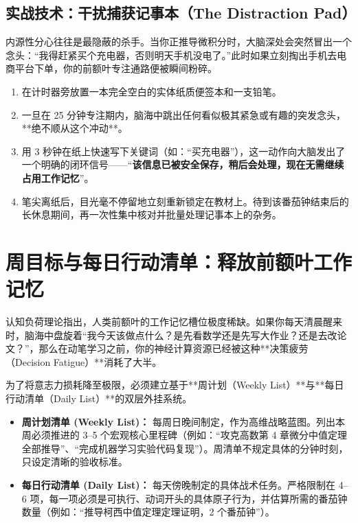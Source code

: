 \documentclass[12pt,a4paper,openany]{ctexbook}
\begin{document}
\subsection*{实战技术：干扰捕获记事本（The Distraction Pad）}

内源性分心往往是最隐蔽的杀手。当你正推导微积分时，大脑深处会突然冒出一个念头：“我得赶紧买个充电器，否则明天手机没电了。”此时如果立刻掏出手机去电商平台下单，你的前额叶专注通路便被瞬间粉碎。

\begin{practicebox}[捕获记事本的标准操作法]
\begin{enumerate}
    \item 在计时器旁放置一本完全空白的实体纸质便签本和一支铅笔。
    \item 一旦在 25 分钟专注期内，脑海中跳出任何看似极其紧急或有趣的突发念头，**绝不顺从这个冲动**。
    \item 用 3 秒钟在纸上快速写下关键词（如：“买充电器”），这一动作向大脑发出了一个明确的闭环信号——“\textbf{该信息已被安全保存，稍后会处理，现在无需继续占用工作记忆}”。
    \item 笔尖离纸后，目光毫不停留地立刻重新锁定在教材上。待到该番茄钟结束后的长休息期间，再一次性集中核对并批量处理记事本上的杂务。
\end{enumerate}
\end{practicebox}

\section{周目标与每日行动清单：释放前额叶工作记忆}

认知负荷理论指出，人类前额叶的工作记忆槽位极度稀缺。如果你每天清晨醒来时，脑海中盘旋着“我今天该做点什么？是先看数学还是先写大作业？还是去改论文？”，那么在动笔学习之前，你的神经计算资源已经被这种**决策疲劳（Decision Fatigue）**消耗了大半。

为了将意志力损耗降至极限，必须建立基于**周计划（Weekly List）**与**每日行动清单（Daily List）**的双层外挂系统。

\begin{keypoint}[双层清单架构运行法则]
\begin{itemize}
    \item \textbf{周计划清单 (Weekly List)：} 每周日晚间制定，作为高维战略蓝图。列出本周必须推进的 3--5 个宏观核心里程碑（例如：“攻克高数第 4 章微分中值定理全部推导”、“完成机器学习实验代码复现”）。周清单不规定具体的分钟时刻，只设定清晰的验收标准。
    \item \textbf{每日行动清单 (Daily List)：} 每天傍晚制定的具体战术任务。严格限制在 4--6 项，每一项必须是可执行、动词开头的具体原子行为，并估算所需的番茄钟数量（例如：“推导柯西中值定理定理证明，2 个番茄钟”）。
\end{itemize}
\end{keypoint}
\end{document}
